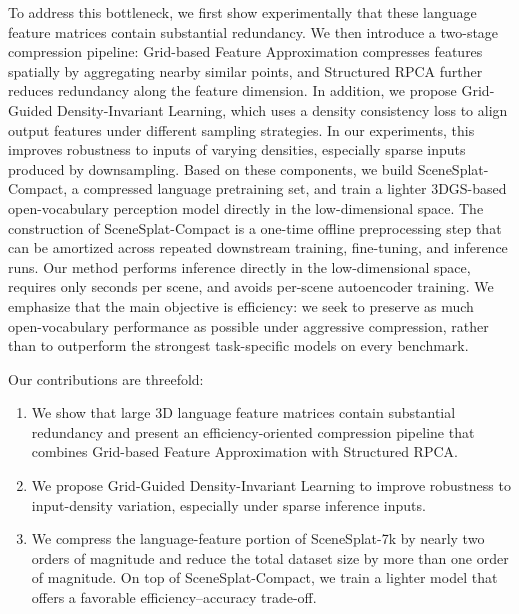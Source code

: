 \documentclass{article}
\begin{document}
To address this bottleneck, we first show experimentally that these language feature matrices contain substantial redundancy. We then introduce a two-stage compression pipeline: Grid-based Feature Approximation compresses features spatially by aggregating nearby similar points, and Structured RPCA further reduces redundancy along the feature dimension.
In addition, we propose Grid-Guided Density-Invariant Learning, which uses a density consistency loss to align output features under different sampling strategies. In our experiments, this improves robustness to inputs of varying densities, especially sparse inputs produced by downsampling.
Based on these components, we build SceneSplat-Compact, a compressed language pretraining set, and train a lighter 3DGS-based open-vocabulary perception model directly in the low-dimensional space. The construction of SceneSplat-Compact is a one-time offline preprocessing step that can be amortized across repeated downstream training, fine-tuning, and inference runs. Our method performs inference directly in the low-dimensional space, requires only seconds per scene, and avoids per-scene autoencoder training. We emphasize that the main objective is efficiency: we seek to preserve as much open-vocabulary performance as possible under aggressive compression, rather than to outperform the strongest task-specific models on every benchmark.

Our contributions are threefold:
\begin{enumerate}
    \item We show that large 3D language feature matrices contain substantial redundancy and present an efficiency-oriented compression pipeline that combines Grid-based Feature Approximation with Structured RPCA.
    \item We propose Grid-Guided Density-Invariant Learning to improve robustness to input-density variation, especially under sparse inference inputs.
    \item We compress the language-feature portion of SceneSplat-7k by nearly two orders of magnitude and reduce the total dataset size by more than one order of magnitude. On top of SceneSplat-Compact, we train a lighter model that offers a favorable efficiency--accuracy trade-off.
\end{enumerate}
\end{document}
